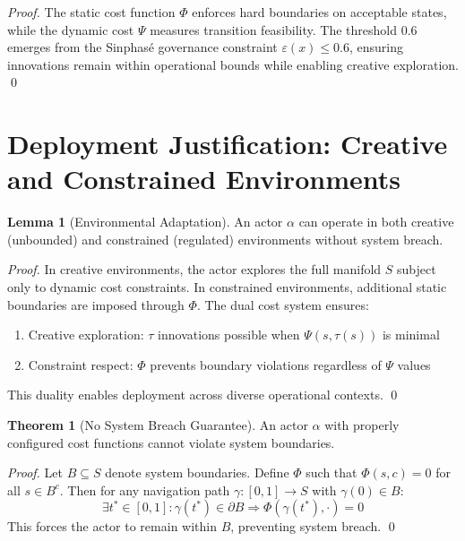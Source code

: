 \documentclass[11pt]{article}
\theoremstyle{definition}
\newtheorem{theorem}{Theorem}
\newtheorem{lemma}{Lemma}
\begin{document}
\begin{proof}
The static cost function $\Phi$ enforces hard boundaries on acceptable states, while the dynamic cost $\Psi$ measures transition feasibility. The threshold 0.6 emerges from the Sinphasé governance constraint $\varepsilon(x) \leq 0.6$, ensuring innovations remain within operational bounds while enabling creative exploration. \qed
\end{proof}

\section{Deployment Justification: Creative and Constrained Environments}

\begin{lemma}[Environmental Adaptation]
An actor $\alpha$ can operate in both creative (unbounded) and constrained (regulated) environments without system breach.
\end{lemma}

\begin{proof}
In creative environments, the actor explores the full manifold $S$ subject only to dynamic cost constraints. In constrained environments, additional static boundaries are imposed through $\Phi$. The dual cost system ensures:
\begin{enumerate}
    \item Creative exploration: $\tau$ innovations possible when $\Psi(s, \tau(s))$ is minimal
    \item Constraint respect: $\Phi$ prevents boundary violations regardless of $\Psi$ values
\end{enumerate}
This duality enables deployment across diverse operational contexts. \qed
\end{proof}

\begin{theorem}[No System Breach Guarantee]
An actor $\alpha$ with properly configured cost functions cannot violate system boundaries.
\end{theorem}

\begin{proof}
Let $B \subseteq S$ denote system boundaries. Define $\Phi$ such that $\Phi(s, c) = 0$ for all $s \in B^c$. Then for any navigation path $\gamma: [0,1] \to S$ with $\gamma(0) \in B$:
\[\exists t^* \in [0,1] : \gamma(t^*) \in \partial B \Rightarrow \Phi(\gamma(t^*), \cdot) = 0\]
This forces the actor to remain within $B$, preventing system breach. \qed
\end{proof}
\end{document}
